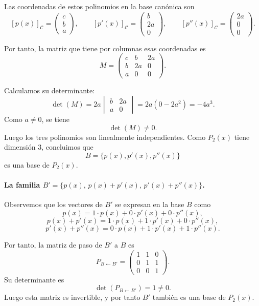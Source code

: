 \documentclass[12pt]{article}
\begin{document}
Las coordenadas de estos polinomios en la base canónica son
\[
[p(x)]_{\mathcal C}=
\begin{pmatrix}
c\\ b\\ a
\end{pmatrix},
\qquad
[p'(x)]_{\mathcal C}=
\begin{pmatrix}
b\\ 2a\\ 0
\end{pmatrix},
\qquad
[p''(x)]_{\mathcal C}=
\begin{pmatrix}
2a\\ 0\\ 0
\end{pmatrix}.
\]

Por tanto, la matriz que tiene por columnas esas coordenadas es
\[
M=
\begin{pmatrix}
c & b & 2a\\
b & 2a & 0\\
a & 0 & 0
\end{pmatrix}.
\]

Calculamos su determinante:
\[
\det(M)
=
2a
\begin{vmatrix}
b & 2a\\
a & 0
\end{vmatrix}
=
2a(0-2a^2)
=
-4a^3.
\]
Como \(a\neq 0\), se tiene
\[
\det(M)\neq 0.
\]
Luego los tres polinomios son linealmente independientes. Como \(P_2(x)\) tiene dimensión \(3\), concluimos que
\[
B=\{p(x),p'(x),p''(x)\}
\]
es una base de \(P_2(x)\).

\paragraph{La familia \(B'=\{p(x),\,p(x)+p'(x),\,p'(x)+p''(x)\}\).}

Observemos que los vectores de \(B'\) se expresan en la base \(B\) como
\[
p(x)=1\cdot p(x)+0\cdot p'(x)+0\cdot p''(x),
\]
\[
p(x)+p'(x)=1\cdot p(x)+1\cdot p'(x)+0\cdot p''(x),
\]
\[
p'(x)+p''(x)=0\cdot p(x)+1\cdot p'(x)+1\cdot p''(x).
\]

Por tanto, la matriz de paso de \(B'\) a \(B\) es
\[
P_{B\leftarrow B'}=
\begin{pmatrix}
1 & 1 & 0\\
0 & 1 & 1\\
0 & 0 & 1
\end{pmatrix}.
\]
Su determinante es
\[
\det(P_{B\leftarrow B'})=1\neq 0.
\]
Luego esta matriz es invertible, y por tanto \(B'\) también es una base de \(P_2(x)\).
\end{document}
